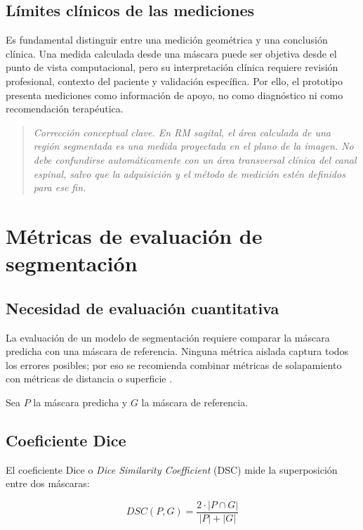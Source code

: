 \subsection{Límites clínicos de las mediciones}

Es fundamental distinguir entre una medición geométrica y una conclusión clínica. Una medida calculada desde una máscara puede ser objetiva desde el punto de vista computacional, pero su interpretación clínica requiere revisión profesional, contexto del paciente y validación específica. Por ello, el prototipo presenta mediciones como información de apoyo, no como diagnóstico ni como recomendación terapéutica.

\begin{quote}
\itshape
Corrección conceptual clave. En RM sagital, el área calculada de una región segmentada es una medida proyectada en el plano de la imagen. No debe confundirse automáticamente con un área transversal clínica del canal espinal, salvo que la adquisición y el método de medición estén definidos para ese fin.
\end{quote}

\section{Métricas de evaluación de segmentación}

\subsection{Necesidad de evaluación cuantitativa}

La evaluación de un modelo de segmentación requiere comparar la máscara predicha con una máscara de referencia. Ninguna métrica aislada captura todos los errores posibles; por eso se recomienda combinar métricas de solapamiento con métricas de distancia o superficie \parencite{taha_metrics_2015,maierhein_metrics_reloaded_2024}.

Sea $P$ la máscara predicha y $G$ la máscara de referencia.

\subsection{Coeficiente Dice}

El coeficiente Dice o \textit{Dice Similarity Coefficient} (DSC) mide la superposición entre dos máscaras:

\begin{equation}
DSC(P,G)=\frac{2\cdot |P \cap G|}{|P|+|G|}
\end{equation}

